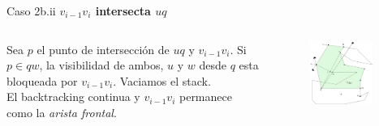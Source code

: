 \documentclass[aspectratio=169,xcolor=dvipsnames, t]{beamer}
\begin{document}
\begin{frame}{Caso 2b.ii}
    \textbf{$v_{i-1}v_{i}$ intersecta $uq$}\\
    \vspace{0.5cm}
    \begin{columns}
    \begin{column}{0.45\textwidth}
        Sea $p$ el punto de intersección de $uq$ y $v_{i-1}v_{i}$. Si $p \in qw$, la visibilidad de ambos, $u$ y $w$ desde $q$ esta bloqueada por $v_{i-1}v_{i}$. Vaciamos el stack.\\
        \vspace{0.5cm}
        El backtracking continua y $v_{i-1}v_{i}$ permanece como la \textit{arista frontal}.\\
    \vspace{0.5cm}
    \end{column}
    \begin{column}{0.45\textwidth}  %
    \vspace{-3cm}
        \begin{figure}
            \centering
            \includegraphics[width=0.85\textwidth]{imagenes/Caso2.7a.png}
        \end{figure}
    \end{column}
    \end{columns}
\end{frame}

\end{document}
